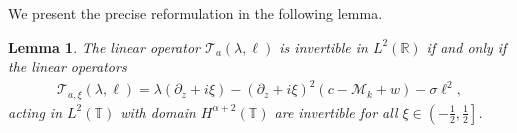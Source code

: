 \documentclass[12pt]{amsart}    %
\newcommand{\R}{\mathbb{R}}
\newcommand{\calM}{\mathcal{M}}
\newtheorem{lemma}[theorem]{Lemma}
\newtheorem{proposition}[theorem]{Proposition}
\numberwithin{equation}{section}
\begin{document}
We present the precise reformulation in the following lemma.
\begin{lemma}
The linear operator $\mathcal T_a(\lambda,\ell)$ is invertible in $L^2(\R)$ if and only if the linear operators
\begin{align*}\label{E:bloch}
\mathcal T_{a,\xi}(\lambda,\ell) = \lambda(\partial_z+i\xi)- (\partial_z+i\xi)^2(c-\calM_k+w)-\sigma\ell^2,
\end{align*}
acting in $L^2(\mathbb{T})$ with domain $H^{\alpha+2}(\mathbb{T})$ are invertible for all $\xi\in\left(-\frac12,\frac12\right]$.
\end{lemma}
\end{document}

